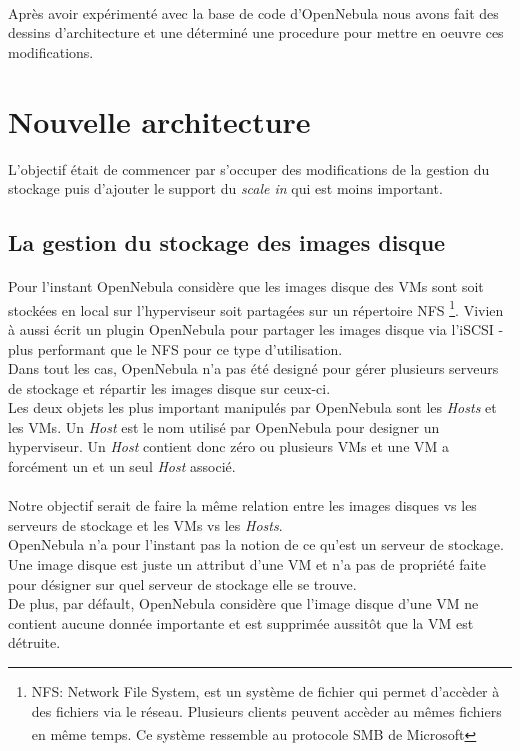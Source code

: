 \paragraph*{}
Après avoir expérimenté avec la base de code d'OpenNebula nous avons fait des dessins d'architecture et une déterminé une procedure pour mettre en oeuvre ces
modifications.


\section{Nouvelle architecture}

L'objectif était de commencer par s'occuper des modifications de la gestion du stockage puis d'ajouter le support du \emph{scale in} qui est moins important.

\subsection{La gestion du stockage des images disque}
\paragraph*{}
Pour l'instant OpenNebula considère que les images disque des VMs sont soit stockées en local sur l'hyperviseur soit partagées sur un répertoire NFS
	\footnote{NFS: Network File System, est un système de fichier qui permet d'accèder à des fichiers via le réseau. Plusieurs clients peuvent accèder
	au mêmes fichiers en même temps. Ce système ressemble au protocole SMB de Microsoft\textsuperscript{\textregistered}}.
Vivien à aussi écrit un plugin OpenNebula pour partager les images disque via l'iSCSI - plus performant que le NFS pour ce type d'utilisation.
\\
Dans tout les cas, OpenNebula n'a pas été designé pour gérer plusieurs serveurs de stockage et répartir les images disque sur ceux-ci.
\\
Les deux objets les plus important manipulés par OpenNebula sont les \emph{Hosts} et les VMs. Un \emph{Host} est le nom utilisé par OpenNebula pour
designer un hyperviseur.
Un \emph{Host} contient donc zéro ou plusieurs VMs et une VM a forcément un et un seul \emph{Host} associé.


\paragraph*{}
Notre objectif serait de faire la même relation entre les images disques vs les serveurs de stockage et les VMs vs les \emph{Hosts}.
\\
OpenNebula n'a pour l'instant pas la notion de ce qu'est un serveur de stockage. Une image disque est juste un attribut d'une VM et n'a
pas de propriété faite pour désigner sur quel serveur de stockage elle se trouve.\\
De plus, par défault, OpenNebula considère que l'image disque d'une VM ne contient aucune donnée importante et est supprimée aussitôt
que la VM est détruite.


